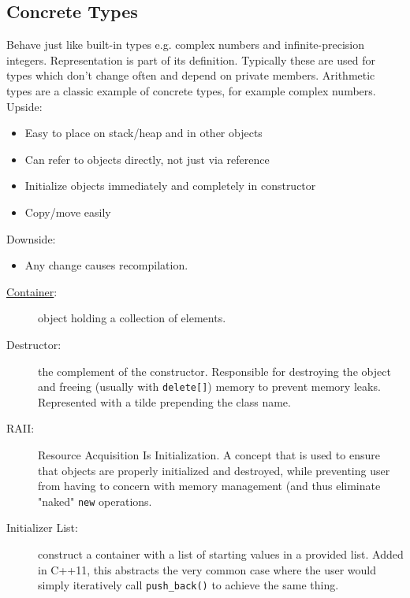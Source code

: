 \documentclass[a4paper, 10pt]{article}
\begin{document}
\subsection{Concrete Types}
Behave just like built-in types e.g. complex numbers and infinite-precision integers. Representation is part of its definition. Typically these are used for types which don't change often and depend on private members. Arithmetic types are a classic example of concrete types, for example complex numbers.
Upside:
\begin{itemize}
	\item Easy to place on stack/heap and in other objects
	\item Can refer to objects directly, not just via reference
	\item Initialize objects immediately and completely in constructor
	\item Copy/move easily
\end{itemize}
Downside:
\begin{itemize}
	\item Any change causes recompilation.
\end{itemize}
\begin{description}
	\item[\href{https://en.cppreference.com/w/cpp/container}{Container}:]
	      object holding a collection of elements.
\end{description}
\begin{description}
	\item[Destructor:]
	      the complement of the constructor. Responsible for destroying the object and freeing (usually with \verb!delete[]!) memory to prevent memory leaks. Represented with a tilde prepending the class name.
\end{description}
\begin{description}
	\item[RAII:]
	      Resource Acquisition Is Initialization. A concept that is used to ensure that objects are properly initialized and destroyed, while preventing user from having to concern with memory management (and thus eliminate "naked" \verb!new! operations.
\end{description}
\begin{description}
	\item[Initializer List:]
	      construct a container with a list of starting values in a provided list. Added in C++11, this abstracts the very common case where the user would simply iteratively call \verb!push_back()! to achieve the same thing.
\end{description}
\end{document}
